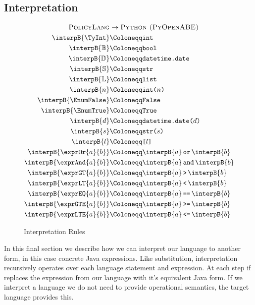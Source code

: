 \subsection{Interpretation}
\label{subsec:interpretation}

\begin{figure}[ht]
  \centering
\begin{align*}
  \textsc{PolicyLang}&\rightarrow\textsc{Python (PyOpenABE)}\\
  \interpB{\TyInt}&\Coloneqq\text{\ttfamily int}\\
  \interpB{\mathbb{B}}&\Coloneqq\text{\ttfamily bool}\\
  \interpB{\mathbb{D}}&\Coloneqq\text{\ttfamily datetime.date}\\
  \interpB{\mathbb{S}}&\Coloneqq\text{\ttfamily str}\\
  \interpB{\mathbb{L}}&\Coloneqq\text{\ttfamily list}\\
  \interpB{n}&\Coloneqq\text{\ttfamily int(}n\text{\ttfamily)}\\
  \interpB{\EnumFalse}&\Coloneqq\text{\ttfamily False}\\
  \interpB{\EnumTrue} &\Coloneqq\text{\ttfamily True}\\
  \interpB{d}&\Coloneqq\text{\ttfamily datetime.date(}d\text{\ttfamily)}\\
  \interpB{s}&\Coloneqq\text{\ttfamily str(}s\text{\ttfamily)}\\
  \interpB{l}&\Coloneqq\text{\ttfamily [}l\text{\ttfamily]}\\
  \interpB{\exprOr{a}{b}}  &\Coloneqq\interpB{a}\,\text{\ttfamily or}\,\interpB{b}\\
  \interpB{\exprAnd{a}{b}} &\Coloneqq\interpB{a}\,\text{\ttfamily and}\,\interpB{b}\\
  \interpB{\exprGT{a}{b}}  &\Coloneqq\interpB{a}\,\text{\ttfamily \textgreater}\,\interpB{b}\\
  \interpB{\exprLT{a}{b}}  &\Coloneqq\interpB{a}\,\text{\ttfamily \textless}\,\interpB{b}\\
  \interpB{\exprEQ{a}{b}}  &\Coloneqq\interpB{a}\,\text{\ttfamily ==}\,\interpB{b}\\
  \interpB{\exprGTE{a}{b}}  &\Coloneqq\interpB{a}\,\text{\ttfamily \textgreater =}\,\interpB{b}\\
  \interpB{\exprLTE{a}{b}}  &\Coloneqq\interpB{a}\,\text{\ttfamily \textless =}\,\interpB{b}
\end{align*}
  \caption{\label{fig:interp}Interpretation Rules}
\end{figure}

In this final section we describe how we can interpret our language to another form, in this case concrete Java expressions.
Like substitution, interpretation recursively operates over each language statement and expression.
At each step if replaces the expression from our language with it's equivalent Java form.
If we interpret a language we do not need to provide operational semantics, the target language provides this.
